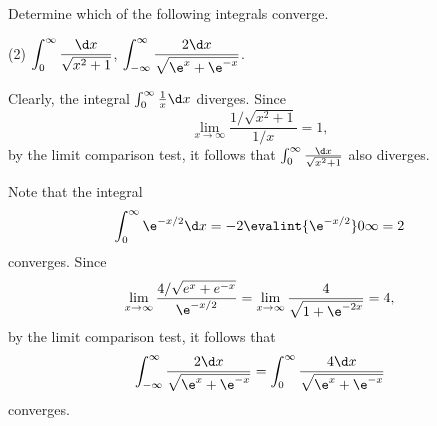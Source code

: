 \clearpage
\begin{problem}
    Determine which of the following integrals converge.

    \begin{tasks}(2)
        \task $\displaystyle\int_0^\infty \frac{\d x}{\sqrt{x^2 + 1}}$,
        \task $\displaystyle\int_{-\infty}^\infty \frac{2 \d x}{\sqrt{\e^x + \e^{-x}}}$.
    \end{tasks}
\end{problem}
\begin{solution}
    \begin{ppart}
        Clearly, the integral $\int_0^\infty \frac1x \d x$ diverges. Since \[\lim_{x \to \infty} \frac{1/\sqrt{x^2 + 1}}{1/x} = 1,\] by the limit comparison test, it follows that $\int_0^\infty \frac{\d x}{\sqrt{x^2 + 1}}$ also diverges.
    \end{ppart}
    \begin{ppart}
        Note that the integral \[\int_0^\infty \e^{-x/2} \d x = -2 \evalint{\e^{-x/2}}0\infty = 2\] converges. Since \[\lim_{x \to \infty} \frac{4 / \sqrt{e^x + e^{-x}}}{\e^{-x/2}} = \lim_{x \to \infty} \frac{4}{\sqrt{1 + \e^{-2x}}} = 4,\] by the limit comparison test, it follows that \[\int_{-\infty}^\infty \frac{2 \d x}{\sqrt{\e^x + \e^{-x}}} = \int_0^\infty \frac{4 \d x}{\sqrt{\e^x + \e^{-x}}}\] converges.
    \end{ppart}
\end{solution}